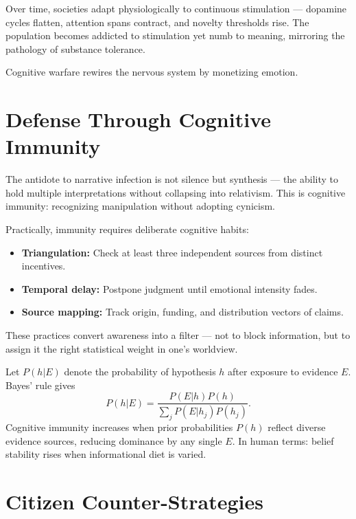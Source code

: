 \documentclass[12pt,twoside]{book}
\begin{document}
Over time, societies adapt physiologically to continuous stimulation — dopamine cycles flatten,
attention spans contract, and novelty thresholds rise.
The population becomes addicted to stimulation yet numb to meaning, mirroring the pathology of substance tolerance.\\

\begin{keyidea}
Cognitive warfare rewires the nervous system by monetizing emotion.
\end{keyidea}

\section{Defense Through Cognitive Immunity}

The antidote to narrative infection is not silence but synthesis — the ability to hold multiple interpretations without collapsing into relativism.
This is cognitive immunity: recognizing manipulation without adopting cynicism.

Practically, immunity requires deliberate cognitive habits:
\begin{itemize}
  \item \textbf{Triangulation:} Check at least three independent sources from distinct incentives.
  \item \textbf{Temporal delay:} Postpone judgment until emotional intensity fades.
  \item \textbf{Source mapping:} Track origin, funding, and distribution vectors of claims.
\end{itemize}

These practices convert awareness into a filter — not to block information, but to assign it the
right statistical weight in one’s worldview.

\begin{tcolorbox}[colback=gray!5,
  colframe=gray!60,
  boxrule=0.4pt,
  arc=1mm,
  title={Mathematical Interlude: Belief Weighting as Bayesian Immunity},
  enhanced,
  breakable,
  left=5pt,
  right=5pt]
\small
Let $P(h|E)$ denote the probability of hypothesis $h$ after exposure to evidence $E$.  
Bayes’ rule gives
\[
P(h|E) = \frac{P(E|h)P(h)}{\sum_j P(E|h_j)P(h_j)}.
\]
Cognitive immunity increases when prior probabilities $P(h)$ reflect diverse evidence sources, reducing dominance by any single $E$.  
In human terms: belief stability rises when informational diet is varied.
\end{tcolorbox}

\section{Citizen Counter-Strategies}
\end{document}
